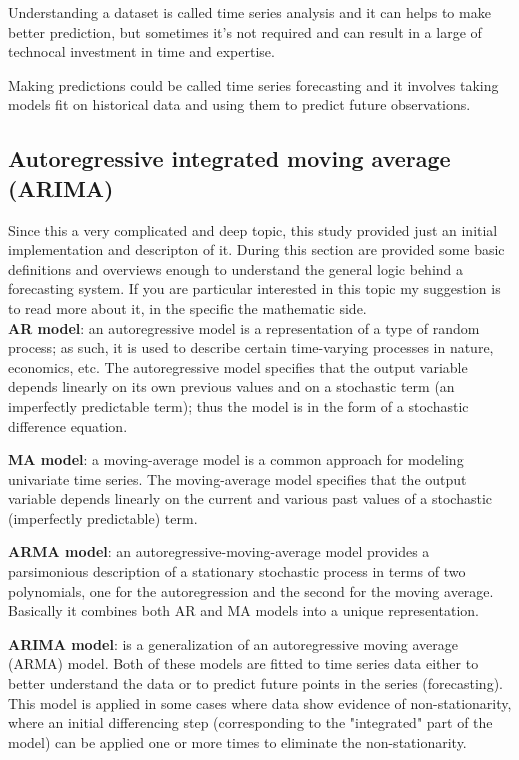 Understanding a dataset is called time series analysis and it can helps to make better prediction, but sometimes it's not required and can result in a large of technocal investment in time and expertise.

Making predictions could be called time series forecasting and it involves taking models fit on historical data and using them to predict future observations.

\newpage 

\subsection{Autoregressive integrated moving average (ARIMA)}
\vspace{-5mm}
Since this a very complicated and deep topic, this study provided just an initial implementation and descripton of it.
During this section are provided some basic definitions and overviews enough to understand the general logic behind a forecasting system. If you are particular interested in this topic my suggestion is to read more about it, in the specific the mathematic side.\\

\textbf{AR model}: an autoregressive model is a representation of a type of random process; as such, it is used to describe certain time-varying processes in nature, economics, etc. The autoregressive model specifies that the output variable depends linearly on its own previous values and on a stochastic term (an imperfectly predictable term); thus the model is in the form of a stochastic difference equation.

\textbf{MA model}: a moving-average model is a common approach for modeling univariate time series. The moving-average model specifies that the output variable depends linearly on the current and various past values of a stochastic (imperfectly predictable) term. 

\textbf{ARMA model}: an autoregressive-moving-average model provides a parsimonious description of a stationary stochastic process in terms of two polynomials, one for the autoregression and the second for the moving average. Basically it combines both AR and MA models into a unique representation.

\textbf{ARIMA model}: is a generalization of an autoregressive moving average (ARMA) model. Both of these models are fitted to time series data either to better understand the data or to predict future points in the series (forecasting).\\
This model is applied in some cases where data show evidence of non-stationarity, where an initial differencing step (corresponding to the "integrated" part of the model) can be applied one or more times to eliminate the non-stationarity.

